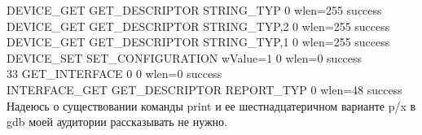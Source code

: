 \documentclass[12pt,a4paper]{article}
\begin{document}
    DEVICE\_GET GET\_DESCRIPTOR STRING\_TYP 0 wlen=255 success\\
    DEVICE\_GET GET\_DESCRIPTOR STRING\_TYP,2 0 wlen=255 success\\
    DEVICE\_GET GET\_DESCRIPTOR STRING\_TYP,1 0 wlen=255 success\\
    DEVICE\_SET SET\_CONFIGURATION wValue=1 0 wlen=0 success\\
    33 GET\_INTERFACE 0 0 wlen=0 success\\
    INTERFACE\_GET GET\_DESCRIPTOR REPORT\_TYP 0 wlen=48 success\\
    Надеюсь о существовании команды print и ее шестнадцатеричном варианте p/x
     в gdb моей аудитории рассказывать не нужно.



\end{document}
